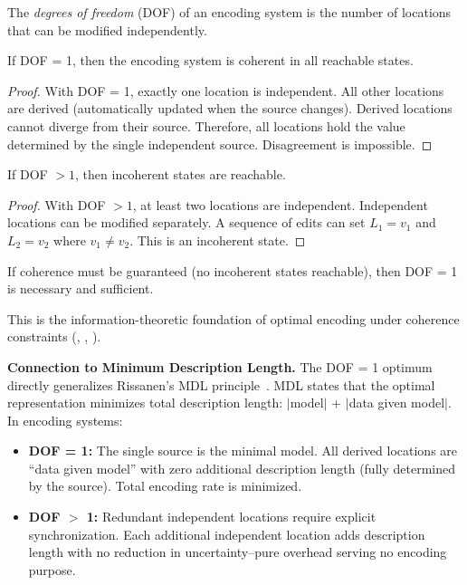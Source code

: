 \begin{definition}\label{def:dof-epistemic}
The \emph{degrees of freedom} (DOF) of an encoding system is the number of locations that can be modified independently.
\end{definition}

\begin{theorem}[DOF = 1 Guarantees Coherence]\label{thm:dof-one-coherence}
If DOF = 1, then the encoding system is coherent in all reachable states.
\end{theorem}

\begin{proof}
With DOF = 1, exactly one location is independent. All other locations are derived (automatically updated when the source changes). Derived locations cannot diverge from their source. Therefore, all locations hold the value determined by the single independent source. Disagreement is impossible.
\end{proof}

\begin{theorem}\label{thm:dof-gt-one-incoherence}
If DOF $> 1$, then incoherent states are reachable.
\end{theorem}

\begin{proof}
With DOF $> 1$, at least two locations are independent. Independent locations can be modified separately. A sequence of edits can set $L_1 = v_1$ and $L_2 = v_2$ where $v_1 \neq v_2$. This is an incoherent state.
\end{proof}

\begin{corollary}[Coherence Forces DOF = 1]\label{cor:coherence-forces-ssot}
If coherence must be guaranteed (no incoherent states reachable), then DOF = 1 is necessary and sufficient.
\end{corollary}

This is the information-theoretic foundation of optimal encoding under coherence constraints (, , ).

\textbf{Connection to Minimum Description Length.} The DOF = 1 optimum directly generalizes Rissanen's MDL principle~\cite{rissanen1978mdl}. MDL states that the optimal representation minimizes total description length: $|$model$|$ + $|$data given model$|$. In encoding systems:

\begin{itemize}
\tightlist
\item \textbf{DOF = 1:} The single source is the minimal model. All derived locations are ``data given model'' with zero additional description length (fully determined by the source). Total encoding rate is minimized.
\item \textbf{DOF $>$ 1:} Redundant independent locations require explicit synchronization. Each additional independent location adds description length with no reduction in uncertainty--pure overhead serving no encoding purpose.
\end{itemize}

